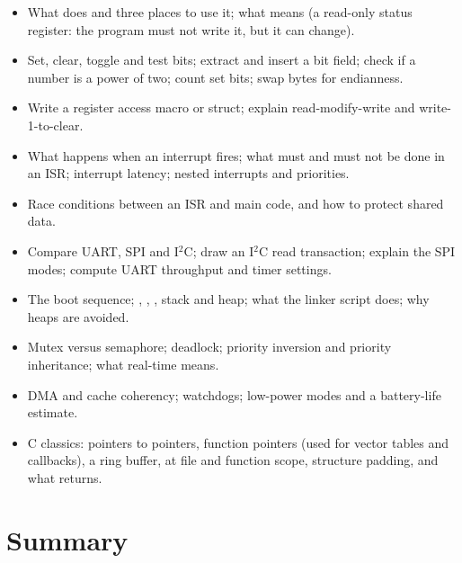 \begin{itemize}
  \item What  does and three places to use it; what  means (a read-only status register: the program must not write it, but it can change).
  \item Set, clear, toggle and test bits; extract and insert a bit field; check if a number is a power of two; count set bits; swap bytes for endianness.
  \item Write a register access macro or struct; explain read-modify-write and write-1-to-clear.
  \item What happens when an interrupt fires; what must and must not be done in an ISR; interrupt latency; nested interrupts and priorities.
  \item Race conditions between an ISR and main code, and how to protect shared data.
  \item Compare UART, SPI and I$^2$C; draw an I$^2$C read transaction; explain the SPI modes; compute UART throughput and timer settings.
  \item The boot sequence; , , , stack and heap; what the linker script does; why heaps are avoided.
  \item Mutex versus semaphore; deadlock; priority inversion and priority inheritance; what real-time means.
  \item DMA and cache coherency; watchdogs; low-power modes and a battery-life estimate.
  \item C classics: pointers to pointers, function pointers (used for vector tables and callbacks), a ring buffer,  at file and function scope, structure padding, and what  returns.
\end{itemize}

\section{Summary}

